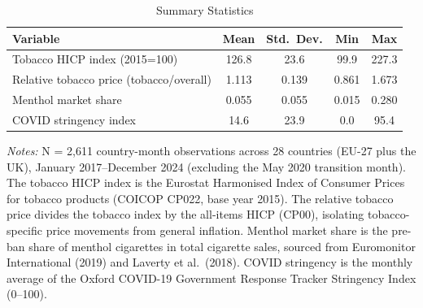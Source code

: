 \begin{table}[H]
\centering
\caption{Summary Statistics}
\label{tab:summary}
\begin{threeparttable}
\begin{tabular}{lcccc}
\toprule
Variable & Mean & Std.\ Dev. & Min & Max \\
\midrule
Tobacco HICP index (2015=100) & 126.8 & 23.6 & 99.9 & 227.3 \\
Relative tobacco price (tobacco/overall) & 1.113 & 0.139 & 0.861 & 1.673 \\
Menthol market share & 0.055 & 0.055 & 0.015 & 0.280 \\
COVID stringency index & 14.6 & 23.9 & 0.0 & 95.4 \\
\bottomrule
\end{tabular}
\begin{tablenotes}[flushleft]
\small
\item \textit{Notes:} N = 2,611 country-month observations across 28 countries (EU-27 plus the UK), January 2017--December 2024 (excluding the May 2020 transition month). The tobacco HICP index is the Eurostat Harmonised Index of Consumer Prices for tobacco products (COICOP CP022, base year 2015). The relative tobacco price divides the tobacco index by the all-items HICP (CP00), isolating tobacco-specific price movements from general inflation. Menthol market share is the pre-ban share of menthol cigarettes in total cigarette sales, sourced from Euromonitor International (2019) and Laverty et al.\ (2018). COVID stringency is the monthly average of the Oxford COVID-19 Government Response Tracker Stringency Index (0--100).
\end{tablenotes}
\end{threeparttable}
\end{table}
